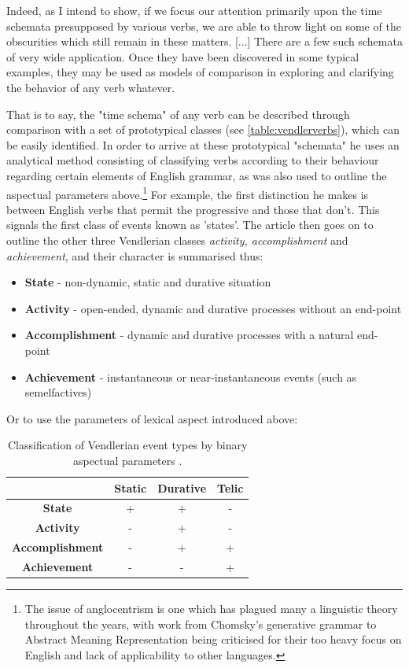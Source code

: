 \begin{displayquote}
    Indeed, as I intend to show, if we focus our attention primarily upon the time schemata presupposed by various verbs, we are able to throw light on some of the obscurities which still remain in these matters. [...] There are a few such schemata of very wide application. Once they have been discovered in some typical examples, they may be used as models of comparison in exploring and clarifying the behavior of any verb whatever.
\end{displayquote}
That is to say, the "time schema" of any verb can be described through comparison with a set of prototypical classes (see \ref{table:vendlerverbs}), which can be easily identified. In order to arrive at these prototypical "schemata" he uses an analytical method consisting of classifying verbs according to their behaviour regarding certain elements of English grammar, as was also used to outline the aspectual parameters above.\footnote{The issue of anglocentrism is one which has plagued many a linguistic theory throughout the years, with work from Chomsky's generative grammar \citep{LEVISEN2019101173} to Abstract Meaning Representation \citep{damonte2018crosslingual} being criticised for their too heavy focus on English and lack of applicability to other languages.} For example, the first distinction he makes is between English verbs that permit the progressive and those that don't. This signals the first class of events known as 'states'. The article then goes on to outline the other three Vendlerian classes \emph{activity, accomplishment} and \emph{achievement}, and their character is summarised thus: 

\begin{itemize}
    \item \textbf{State} - non-dynamic, static and durative situation
    \item \textbf{Activity} - open-ended, dynamic and durative processes without an end-point
    \item \textbf{Accomplishment} - dynamic and durative processes with a natural end-point
    \item \textbf{Achievement} - instantaneous or near-instantaneous events (such as semelfactives)
\end{itemize}

Or to use the parameters of lexical aspect introduced above:
\begin{table}[h]
    \centering
    \begin{tabular}{|c||c|c|c|}
        \hline
                                & Static & Durative & Telic \\ \hline
        \textbf{State}          & +      & +        & - \\ \hline
        \textbf{Activity}       & -      & +        & - \\ \hline
        \textbf{Accomplishment} & -      & +        & + \\ \hline
        \textbf{Achievement}    & -      & -        & + \\ \hline
    \end{tabular}
    \caption{Classification of Vendlerian event types by binary aspectual parameters \citep{Smith1991ThePO}.}
\end{table}

